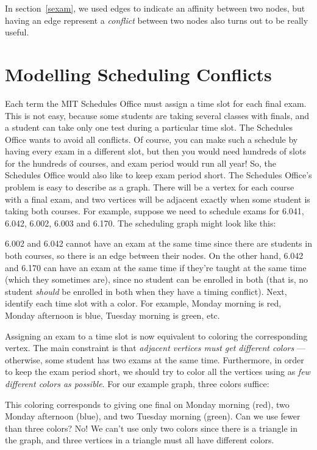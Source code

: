 In section~\ref{sexam},
we used edges to indicate an affinity between two nodes, but having an
edge represent a \emph{conflict} between two nodes also turns out to be
really useful.

\section{Modelling Scheduling Conflicts}

Each term the MIT Schedules Office must assign a time slot for each final
exam.  This is not easy, because some students are taking several classes
with finals, and a student can take only one test during a particular time
slot.  The Schedules Office wants to avoid all conflicts.  Of course, you
can make such a schedule by having every exam in a different slot, but
then you would need hundreds of slots for the hundreds of courses, and
exam period would run all year!  So, the Schedules Office would also like
to keep exam period short.  The Schedules Office's problem is easy to
describe as a graph.  There will be a vertex for each course with a final
exam, and two vertices will be adjacent exactly when some student is
taking both courses.  For example, suppose we need to schedule exams for
6.041, 6.042, 6.002, 6.003 and 6.170.  The scheduling graph might look
like this:


6.002 and 6.042 cannot have an exam at the same time since there are
students in both courses, so there is an edge between their nodes.  On the
other hand, 6.042 and 6.170 can have an exam at the same time if they're
taught at the same time (which they sometimes are), since no student can
be enrolled in both (that is, no student \emph{should} be enrolled in both
when they have a timing conflict).  Next, identify each time slot with a
color.  For example, Monday morning is red, Monday afternoon is blue,
Tuesday morning is green, etc.

Assigning an exam to a time slot is now equivalent to coloring the
corresponding vertex.  The main constraint is that \emph{adjacent vertices
  must get different colors} ---otherwise, some student has two exams at
the same time.  Furthermore, in order to keep the exam period short, we
should try to color all the vertices using as \emph{few different colors
  as possible}.  For our example graph, three colors suffice:


This coloring corresponds to giving one final on Monday morning (red),
two Monday afternoon (blue), and two Tuesday morning (green).
Can we use fewer than three colors?  No! We can't use only two colors
since there is a triangle in the graph, and three vertices in a triangle
must all have different colors.

